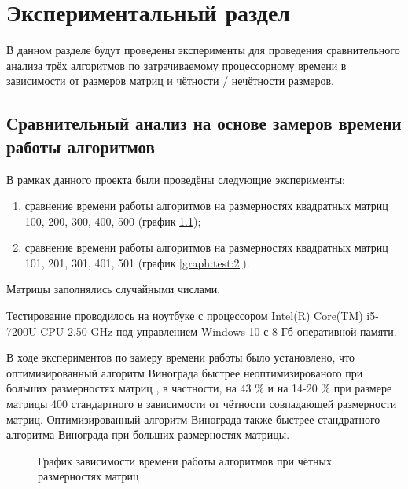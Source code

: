 \chapter{Экспериментальный раздел}
\label{cha:research}
    В данном разделе будут проведены эксперименты для проведения 
    сравнительного анализа трёх алгоритмов по затрачиваемому процессорному 
    времени в зависимости от размеров матриц и чётности / нечётности размеров.

    \section{Сравнительный анализ на основе замеров времени работы алгоритмов}
        В рамках данного проекта были проведёны следующие эксперименты:
        \begin{enumerate}
            \item сравнение времени работы алгоритмов на размерностях квадратных матриц 100, 200, 300, 400, 500 (график \ref{graph:test:1});
            \item сравнение времени работы алгоритмов на размерностях квадратных матриц 101, 201, 301, 401, 501 (график \ref{graph:test:2}).
        \end{enumerate}

        Матрицы заполнялись случайными числами.

        Тестирование проводилось на ноутбуке с процессором
        Intel(R) Core(TM) i5-7200U CPU 2.50 GHz \cite{processor-i5-7200u}
        под управлением Windows 10 с 8 Гб оперативной памяти.

        В ходе экспериментов по замеру времени работы было установлено, что 
        оптимизированный алгоритм Винограда быстрее неоптимизированого при больших размерностях матриц , в частности, на 43 \% и
        на 14-20 \% при размере матрицы 400 стандартного в зависимости от чётности совпадающей размерности матриц.  Оптимизированный алгоритм 		Винограда также быстрее стандратного алгоритма Винограда при больших размерностях матрицы.


    \begin{figure}[h!]
        \centering
        \caption{График зависимости времени работы алгоритмов при чётных размерностях матриц} 
        \label{graph:test:1}
    \end{figure}

